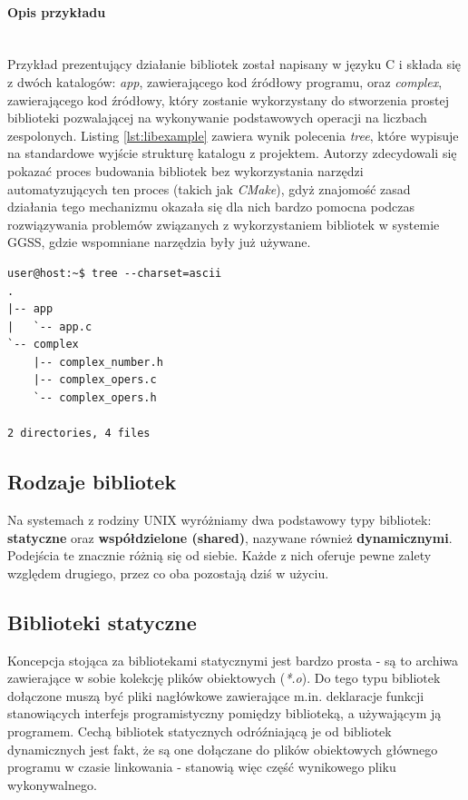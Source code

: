 \paragraph*{Opis przykładu}\mbox{}\\
Przykład prezentujący działanie bibliotek został napisany w języku C i  składa się z dwóch katalogów: \textit{app}, zawierającego kod źródłowy programu, oraz \textit{complex}, zawierającego kod źródłowy, który zostanie wykorzystany do stworzenia prostej biblioteki pozwalającej na wykonywanie podstawowych operacji na liczbach zespolonych. Listing \ref{lst:libexample} zawiera wynik polecenia \textit{tree}, które wypisuje na standardowe wyjście strukturę katalogu z projektem. Autorzy zdecydowali się pokazać proces budowania bibliotek bez wykorzystania narzędzi automatyzujących ten proces (takich jak \textit{CMake}), gdyż znajomość zasad działania tego mechanizmu okazała się dla nich bardzo pomocna podczas rozwiązywania problemów związanych z wykorzystaniem bibliotek w systemie GGSS, gdzie wspomniane narzędzia były już używane.

\begin{lstlisting}[style=Cmd, caption={Struktura katalogów projektu stanowiącego bazę przykładu dotyczącego bibliotek.},label={lst:libexample}]
user@host:~$ tree --charset=ascii
.
|-- app
|   `-- app.c
`-- complex
    |-- complex_number.h
    |-- complex_opers.c
    `-- complex_opers.h

2 directories, 4 files
\end{lstlisting}


\subsection{Rodzaje bibliotek}
Na systemach z rodziny UNIX wyróżniamy dwa podstawowy typy bibliotek: \textbf{statyczne} oraz \textbf{współdzielone (shared)}, nazywane również \textbf{dynamicznymi}. Podejścia te znacznie różnią się od siebie. Każde z nich oferuje pewne zalety względem drugiego, przez co oba pozostają dziś w użyciu.



\subsection{Biblioteki statyczne}
Koncepcja stojąca za bibliotekami statycznymi jest bardzo prosta \cite{Compiling} - są to archiwa zawierające w sobie kolekcję plików obiektowych (\textit{*.o}). Do tego typu bibliotek dołączone muszą być pliki nagłówkowe zawierające m.in. deklaracje funkcji stanowiących interfejs programistyczny pomiędzy biblioteką, a używającym ją programem. Cechą bibliotek statycznych odróźniającą je od bibliotek dynamicznych jest fakt, że są one dołączane do plików obiektowych głównego programu w czasie linkowania - stanowią więc część wynikowego pliku wykonywalnego. 




